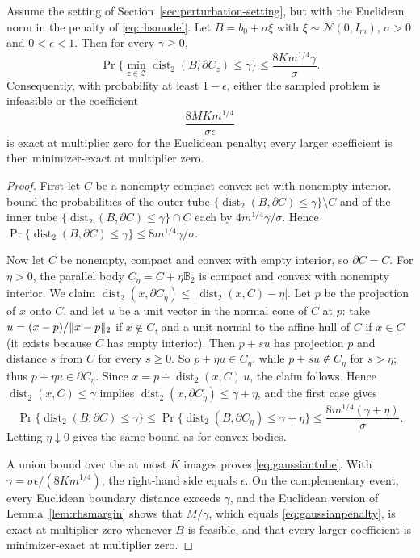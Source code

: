 \begin{proposition}\label{prop:gaussian}
Assume the setting of Section~\ref{sec:perturbation-setting}, but with
the Euclidean norm in the penalty of \eqref{eq:rhsmodel}. Let
$B=b_0+\sigma\xi$ with $\xi\sim\mathcal N(0,I_m)$, $\sigma>0$ and
$0<\epsilon<1$. Then for every $\gamma\ge0$,
\begin{equation}\label{eq:gaussiantube}
 \Pr\{\min_{z\in\mathcal Z}\operatorname{dist}_2(B,\partial C_z)\le\gamma\}
       \le\frac{8Km^{1/4}\gamma}\sigma .
\end{equation}
Consequently, with probability at least $1-\epsilon$, either the sampled
problem is infeasible or the coefficient
\begin{equation}\label{eq:gaussianpenalty}
 \frac{8MKm^{1/4}}{\sigma\epsilon}
\end{equation}
is exact at multiplier zero for the Euclidean penalty; every larger
coefficient is then minimizer-exact at multiplier zero.
\end{proposition}
\begin{proof}
First let $C$ be a nonempty compact convex set with nonempty interior.
\citet[Lemma~2.3.4]{DunaganSpielmanTeng2011} bound the probabilities of
the outer tube $\{\operatorname{dist}_2(B,\partial C)\le\gamma\}\setminus C$
and of the inner tube $\{\operatorname{dist}_2(B,\partial C)\le\gamma\}\cap C$
each by $4m^{1/4}\gamma/\sigma$. Hence
$\Pr\{\operatorname{dist}_2(B,\partial C)\le\gamma\}\le8m^{1/4}\gamma/\sigma$.

Now let $C$ be nonempty, compact and convex with empty interior, so
$\partial C=C$. For $\eta>0$, the parallel body
$C_\eta=C+\eta\mathbb B_2$ is compact and convex with nonempty interior.
We claim $\operatorname{dist}_2(x,\partial C_\eta)\le|\operatorname{dist}_2(x,C)-\eta|$.
Let $p$ be the projection of $x$ onto $C$, and let $u$ be a unit vector
in the normal cone of $C$ at $p$: take $u=(x-p)/\lVert x-p\rVert_2$ if
$x\notin C$, and a unit normal to the affine hull of $C$ if $x\in C$
(it exists because $C$ has empty interior). Then $p+su$ has projection
$p$ and distance $s$ from $C$ for every $s\ge0$. So $p+\eta u\in C_\eta$,
while $p+su\notin C_\eta$ for $s>\eta$; thus $p+\eta u\in\partial C_\eta$.
Since $x=p+\operatorname{dist}_2(x,C)\,u$, the claim follows. Hence
$\operatorname{dist}_2(x,C)\le\gamma$ implies
$\operatorname{dist}_2(x,\partial C_\eta)\le\gamma+\eta$, and the
first case gives
\[
 \Pr\{\operatorname{dist}_2(B,\partial C)\le\gamma\}
 \le\Pr\{\operatorname{dist}_2(B,\partial C_\eta)\le\gamma+\eta\}
 \le\frac{8m^{1/4}(\gamma+\eta)}\sigma .
\]
Letting $\eta\downarrow0$ gives the same bound as for convex bodies.

A union bound over the at most $K$ images proves \eqref{eq:gaussiantube}.
With $\gamma=\sigma\epsilon/(8Km^{1/4})$, the right-hand side equals
$\epsilon$. On the complementary event, every Euclidean boundary distance
exceeds $\gamma$, and the Euclidean version of Lemma~\ref{lem:rhsmargin}
shows that $M/\gamma$, which equals \eqref{eq:gaussianpenalty}, is exact
at multiplier zero whenever $B$ is feasible, and that every larger
coefficient is minimizer-exact at multiplier zero.
\end{proof}
